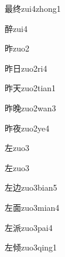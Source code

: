 \begin{verbete}[12;8]{最终}{zui4zhong1}
\end{verbete}

\begin{verbete}[15]{醉}{zui4}
\end{verbete}

\begin{verbete}[9]{昨}{zuo2}
\end{verbete}

\begin{verbete}[9;4]{昨日}{zuo2ri4}
\end{verbete}

\begin{verbete}[9;4]{昨天}{zuo2tian1}
\end{verbete}

\begin{verbete}[9;11]{昨晚}{zuo2wan3}
\end{verbete}

\begin{verbete}[9;8]{昨夜}{zuo2ye4}
\end{verbete}

\begin{verbete}[5]{左}{zuo3}
\end{verbete}
\begin{verbete*}[5]{左}{zuo3}
\end{verbete*}

\begin{verbete}[5;5]{左边}{zuo3bian5}
\end{verbete}

\begin{verbete}[5;9]{左面}{zuo3mian4}
\end{verbete}

\begin{verbete}[5;9]{左派}{zuo3pai4}
\end{verbete}

\begin{verbete}[5;10]{左倾}{zuo3qing1}
\end{verbete}

